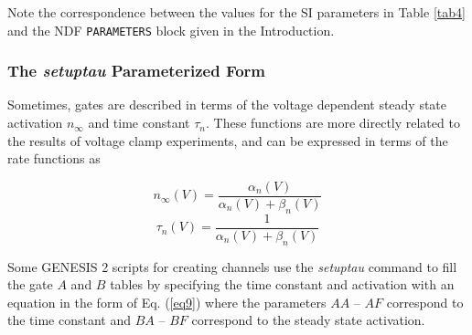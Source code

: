 \documentclass[12pt]{article}
\begin{document}
Note the correspondence between the values for the SI parameters in Table
\ref{tab4} and the NDF {\tt PARAMETERS} block given in the Introduction.

\subsubsection{The {\em setuptau} Parameterized Form}
\label{sec4-2}

Sometimes, gates are described in terms of the voltage dependent steady state
activation $n_\infty$ and time constant $\tau_n$.  These functions are more
directly related to the results of voltage clamp experiments, and can be
expressed in terms of the rate functions as

\begin{equation}
n_\infty(V) = \frac{ \alpha_n(V) }{ \alpha_n(V) + \beta_n(V) }
\label{eq11}
\end{equation}
\begin{equation}
\tau_n(V) = \frac{1}{\alpha_n(V) + \beta_n(V)}
\label{eq12}
\end{equation}


Some GENESIS 2 scripts for creating channels use the {\em setuptau} command
to fill the gate $A$ and $B$ tables by specifying the time constant and
activation with an equation in the form of Eq. (\ref{eq9}) where the
parameters $AA$ -- $AF$ correspond to the time constant and $BA$ -- $BF$
correspond to the steady state activation.
\end{document}
